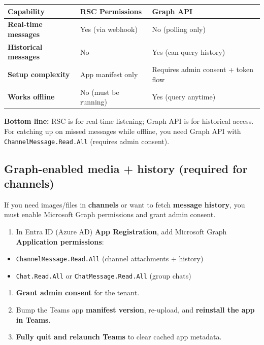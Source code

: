 \begin{table}[h]
\centering
\small
\begin{tabular}{|l|l|l|}
\hline
Capability & RSC Permissions & Graph API \\
\hline
\textbf{Real-time messages} & Yes (via webhook) & No (polling only) \\
\hline
\textbf{Historical messages} & No & Yes (can query history) \\
\hline
\textbf{Setup complexity} & App manifest only & Requires admin consent + token flow \\
\hline
\textbf{Works offline} & No (must be running) & Yes (query anytime) \\
\hline
\end{tabular}
\end{table}



\textbf{Bottom line:} RSC is for real-time listening; Graph API is for historical access. For catching up on missed messages while offline, you need Graph API with \texttt{ChannelMessage.Read.All} (requires admin consent).

\subsection{Graph-enabled media + history (required for channels)}


If you need images/files in \textbf{channels} or want to fetch \textbf{message history}, you must enable Microsoft Graph permissions and grant admin consent.

\begin{enumerate}
  \item In Entra ID (Azure AD) \textbf{App Registration}, add Microsoft Graph \textbf{Application permissions}:
\end{enumerate}

\begin{itemize}
  \item \texttt{ChannelMessage.Read.All} (channel attachments + history)
  \item \texttt{Chat.Read.All} or \texttt{ChatMessage.Read.All} (group chats)
\end{itemize}

\begin{enumerate}
  \item \textbf{Grant admin consent} for the tenant.
  \item Bump the Teams app \textbf{manifest version}, re-upload, and \textbf{reinstall the app in Teams}.
  \item \textbf{Fully quit and relaunch Teams} to clear cached app metadata.
\end{enumerate}


